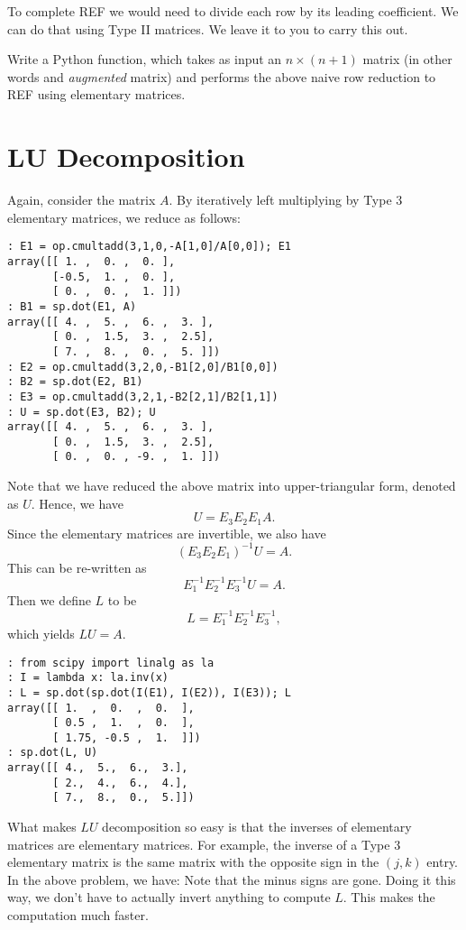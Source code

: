 To complete REF we would need to divide each row by its leading
coefficient.  We can do that using Type II matrices.  We leave it to
you to carry this out.

\begin{problem}
\label{prob:REF}
Write a Python function, which takes as input an
$n\times (n+1)$ matrix (in other words and \emph{augmented} matrix) and performs the above naive row reduction to REF using elementary matrices.
\end{problem}

\section*{LU Decomposition}

Again, consider the matrix $A$. By iteratively left multiplying by Type 3
elementary matrices, we reduce as follows:

\begin{lstlisting}[style=python]
: E1 = op.cmultadd(3,1,0,-A[1,0]/A[0,0]); E1
array([[ 1. ,  0. ,  0. ],
       [-0.5,  1. ,  0. ],
       [ 0. ,  0. ,  1. ]])
: B1 = sp.dot(E1, A)
array([[ 4. ,  5. ,  6. ,  3. ],
       [ 0. ,  1.5,  3. ,  2.5],
       [ 7. ,  8. ,  0. ,  5. ]])
: E2 = op.cmultadd(3,2,0,-B1[2,0]/B1[0,0])
: B2 = sp.dot(E2, B1)
: E3 = op.cmultadd(3,2,1,-B2[2,1]/B2[1,1])
: U = sp.dot(E3, B2); U
array([[ 4. ,  5. ,  6. ,  3. ],
       [ 0. ,  1.5,  3. ,  2.5],
       [ 0. ,  0. , -9. ,  1. ]])
\end{lstlisting}
Note that we have reduced the above matrix into upper-triangular
form, denoted as $U$.  Hence, we have
\[
U = E_3 E_2 E_1 A.
\]
Since the elementary matrices are invertible, we also have
\[
(E_3 E_2 E_1)^{-1} U =  A.
\]
This can be re-written as
\[
E_1^{-1} E_2^{-1} E_3^{-1} U =  A.
\]
Then we define $L$ to be
\[
L = E_1^{-1} E_2^{-1} E_3^{-1},
\]
which yields $L U = A$.  
\begin{lstlisting}[style=python]
: from scipy import linalg as la
: I = lambda x: la.inv(x)
: L = sp.dot(sp.dot(I(E1), I(E2)), I(E3)); L
array([[ 1.  ,  0.  ,  0.  ],
       [ 0.5 ,  1.  ,  0.  ],
       [ 1.75, -0.5 ,  1.  ]])
: sp.dot(L, U)
array([[ 4.,  5.,  6.,  3.],
       [ 2.,  4.,  6.,  4.],
       [ 7.,  8.,  0.,  5.]])
\end{lstlisting}
What makes $LU$ decomposition so easy is that the inverses of
elementary matrices are elementary matrices.  For example, the
inverse of a Type 3 elementary matrix is the same matrix with the
opposite sign in the $(j,k)$ entry.  In the above problem, we have:
Note that the minus signs are gone.  Doing it this way, we don't
have to actually invert anything to compute $L$.  This makes the
computation much faster.


